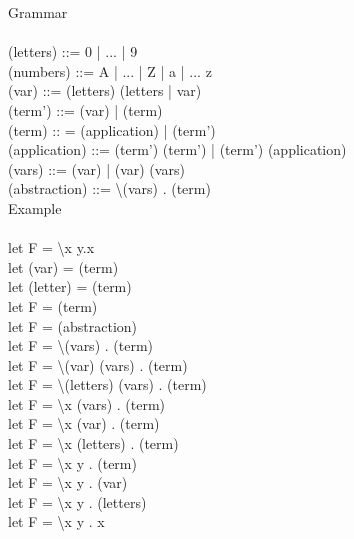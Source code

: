 \documentclass{article}
\begin{document}
Grammar \\
\\
(letters) ::= 0 | ... | 9 \\
(numbers) ::= A \;|\; ... \;|\; Z \;|\; a \;|\; ... z \\
(var) ::= (letters) (letters | var) \\
(term') ::= (var) | (term) \\
(term) :: = (application) | (term') \\
(application) ::= (term') (term') | (term') (application) \\
(vars) ::= (var) | (var) (vars) \\
(abstraction) ::= \textbackslash (vars) . (term) \\

Example \\
\\
let F =  \textbackslash x y.x \\
let (var) = (term) \\
let (letter) = (term) \\
let F = (term) \\
let F = (abstraction) \\
let F = \textbackslash (vars) . (term) \\
let F = \textbackslash (var) (vars) . (term) \\
let F = \textbackslash (letters) (vars) . (term) \\
let F = \textbackslash x (vars) . (term) \\
let F = \textbackslash x (var) . (term) \\
let F = \textbackslash x (letters) . (term) \\
let F = \textbackslash x y . (term) \\
let F = \textbackslash x y . (var) \\
let F = \textbackslash x y . (letters) \\
let F =  \textbackslash x y . x \\
\end{document}
